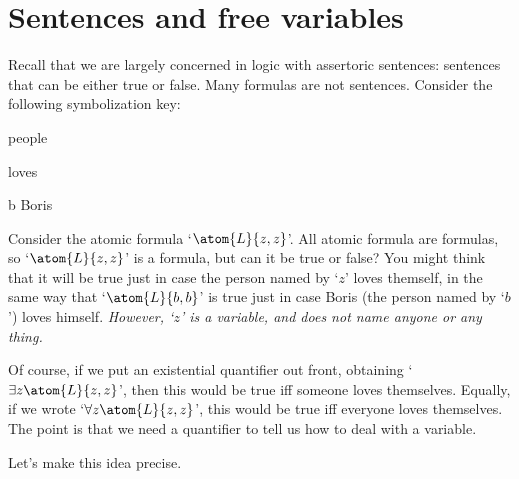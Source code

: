 

\section{Sentences and free variables}
Recall that we are largely concerned in logic with assertoric sentences: sentences that can be either true or false. Many formulas are not sentences. Consider the following symbolization key:
	\begin{ekey}
		\item[\text{domain}] people
		\item[\atom{L}{x,y}]  loves 
		\item[b] Boris
	\end{ekey}
Consider the atomic formula `$\atom{L}{z,z}$'. All atomic formula are formulas, so `$\atom{L}{z,z}$' is a formula, but can it be true or false? You might think that it will be true just in case the person named by `$z$' loves themself, in the same way that `$\atom{L}{b,b}$' is true just in case Boris (the person named by `$b$') loves himself. \emph{However, `$z$' is a variable, and does not name anyone or any thing.}

Of course, if we put an existential quantifier out front, obtaining `$\exists z\atom{L}{z,z}$', then this would be true iff someone loves themselves. Equally, if we wrote `$\forall z \atom{L}{z,z}$', this would be true iff everyone loves themselves. The point is that we need a quantifier to tell us how to deal with a variable.

Let's make this idea precise.



